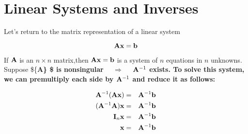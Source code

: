 \documentclass[]{book}
\theoremstyle{definition}
\theoremstyle{definition}
\theoremstyle{definition}
\theoremstyle{remark}
\begin{document}




\section{Linear Systems and Inverses}\label{linear-systems-and-inverses}

Let's return to the matrix representation of a linear system

\[\bf {\bf A} x = b\]

If \({\bf A}\) is an \(n\times n\) matrix,then \(\bf {\bf A} x=b\) is a
system of \(n\) equations in \(n\) unknowns. Suppose \$\{\bf A\} \$ is
nonsingular \(\quad \Longrightarrow \quad\) \({\bf A}^{-1}\) exists. To
solve this system, we can premultiply each side by \({\bf A}^{-1}\) and
reduce it as follows:

\begin{eqnarray} 
            {\bf A}^{-1} ({\bf A} \bf x)&=&{\bf A}^{-1} \bf b \nonumber\\
            ({\bf A}^{-1} {\bf A})\bf x &=&{\bf A}^{-1} \bf b \nonumber\\
            {\bf I}_n \bf x     &=&{\bf A}^{-1} \bf b \nonumber\\
            \bf x&=&{\bf A}^{-1} \bf b \nonumber
\end{eqnarray}
\end{document}
